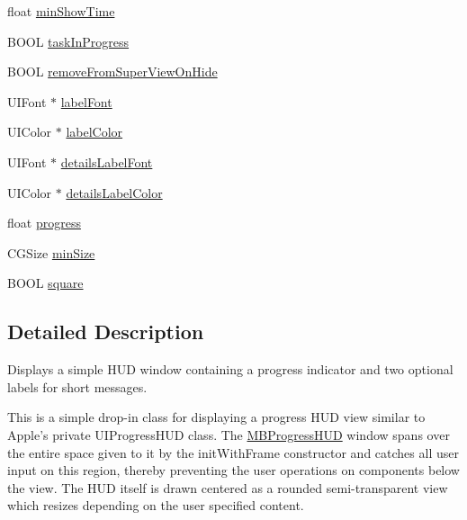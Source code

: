 \begin{DoxyCompactItemize}
float \hyperlink{interface_m_b_progress_h_u_d_a9946e4b0b16d75f070ff0cbcc50226ef}{min\+Show\+Time}
\item 
B\+O\+O\+L \hyperlink{interface_m_b_progress_h_u_d_a6077ea42c37c18b3058ed63ac10ede8f}{task\+In\+Progress}
\item 
B\+O\+O\+L \hyperlink{interface_m_b_progress_h_u_d_a36639aa18a70f2734942695c32ec5e91}{remove\+From\+Super\+View\+On\+Hide}
\item 
U\+I\+Font $\ast$ \hyperlink{interface_m_b_progress_h_u_d_ae61e736a34f341f4190b065f19010af8}{label\+Font}
\item 
U\+I\+Color $\ast$ \hyperlink{interface_m_b_progress_h_u_d_a04eba696a66f65d28b485bb5f0a940cd}{label\+Color}
\item 
U\+I\+Font $\ast$ \hyperlink{interface_m_b_progress_h_u_d_af070a363d323d8eb0285e38d398b51c2}{details\+Label\+Font}
\item 
U\+I\+Color $\ast$ \hyperlink{interface_m_b_progress_h_u_d_ace929217bd7673159f063d5b8e80b080}{details\+Label\+Color}
\item 
float \hyperlink{interface_m_b_progress_h_u_d_a4c8328617d11efd1f5452032246ca97f}{progress}
\item 
C\+G\+Size \hyperlink{interface_m_b_progress_h_u_d_a69c6b2cad533d6fe7d90df02bf7f8b0c}{min\+Size}
\item 
B\+O\+O\+L \hyperlink{interface_m_b_progress_h_u_d_a4bf7271b213e304259aa7d97f7cb1849}{square}
\end{DoxyCompactItemize}


\subsection{Detailed Description}
Displays a simple H\+U\+D window containing a progress indicator and two optional labels for short messages.

This is a simple drop-\/in class for displaying a progress H\+U\+D view similar to Apple's private U\+I\+Progress\+H\+U\+D class. The \hyperlink{interface_m_b_progress_h_u_d}{M\+B\+Progress\+H\+U\+D} window spans over the entire space given to it by the init\+With\+Frame constructor and catches all user input on this region, thereby preventing the user operations on components below the view. The H\+U\+D itself is drawn centered as a rounded semi-\/transparent view which resizes depending on the user specified content.

